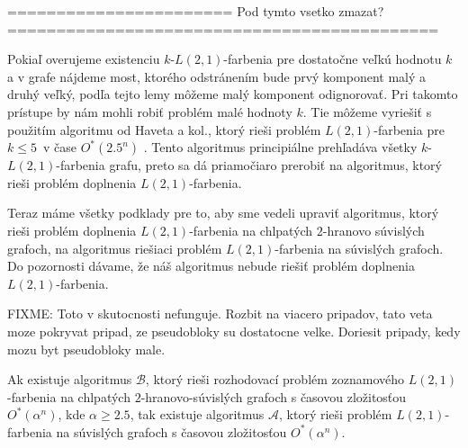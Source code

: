 ======================= Pod tymto vsetko zmazat? ============================================

Pokiaľ overujeme existenciu $k$-$L(2,1)$-farbenia pre dostatočne veľkú hodnotu $k$ a v grafe
nájdeme most, ktorého odstránením bude prvý komponent malý a druhý veľký, podľa tejto lemy
môžeme malý komponent odignorovať. Pri takomto prístupe by nám mohli robiť problém malé
hodnoty $k$. Tie môžeme vyriešiť s použitím algoritmu od Haveta a kol., ktorý rieši
problém $L(2,1)$-farbenia pre $k \leq 5$ v čase $O^*(2.5^n)$ \cite{havet}. Tento
algoritmus principiálne prehľadáva všetky $k$-$L(2,1)$-farbenia grafu, preto sa dá
priamočiaro prerobiť na algoritmus, ktorý rieši problém doplnenia $L(2,1)$-farbenia.

Teraz máme všetky podklady pre to, aby sme vedeli upraviť algoritmus,
ktorý rieši problém doplnenia $L(2,1)$-farbenia na chlpatých
$2$-hranovo súvislých grafoch, na algoritmus riešiaci problém $L(2,1)$-farbenia
na súvislých grafoch. Do pozornosti dávame, že náš algoritmus nebude riešiť
problém doplnenia $L(2,1)$-farbenia.

\begin{veta}
    FIXME: Toto v skutocnosti nefunguje. Rozbit na viacero pripadov, tato veta moze pokryvat pripad, ze
    pseudobloky su dostatocne velke. Doriesit pripady, kedy mozu byt pseudobloky male.

    Ak existuje algoritmus $\mathcal{B}$, ktorý rieši rozhodovací problém zoznamového $L(2,1)$-farbenia
    na chlpatých $2$-hranovo-súvislých grafoch s časovou zložitosťou $O^*(\alpha^n)$, kde
    $\alpha \ge 2.5$, tak existuje algoritmus $\mathcal{A}$, ktorý rieši problém $L(2,1)$-farbenia
    na súvislých grafoch s časovou zložitosťou $O^*(\alpha^n)$.
\end{veta}

